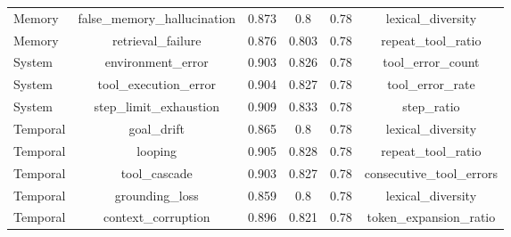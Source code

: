 \begin{table}[htbp]
\begin{tabular}{lccccc}
Memory & false_memory_hallucination & 0.873 & 0.8 & 0.78 & lexical_diversity \\
Memory & retrieval_failure & 0.876 & 0.803 & 0.78 & repeat_tool_ratio \\
System & environment_error & 0.903 & 0.826 & 0.78 & tool_error_count \\
System & tool_execution_error & 0.904 & 0.827 & 0.78 & tool_error_rate \\
System & step_limit_exhaustion & 0.909 & 0.833 & 0.78 & step_ratio \\
Temporal & goal_drift & 0.865 & 0.8 & 0.78 & lexical_diversity \\
Temporal & looping & 0.905 & 0.828 & 0.78 & repeat_tool_ratio \\
Temporal & tool_cascade & 0.903 & 0.827 & 0.78 & consecutive_tool_errors \\
Temporal & grounding_loss & 0.859 & 0.8 & 0.78 & lexical_diversity \\
Temporal & context_corruption & 0.896 & 0.821 & 0.78 & token_expansion_ratio \\
\bottomrule
\end{tabular}
\end{table}
